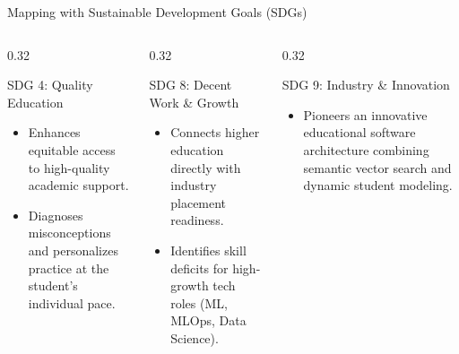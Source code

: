 \documentclass[aspectratio=169,10pt]{beamer}
\begin{document}
\begin{frame}{Mapping with Sustainable Development Goals (SDGs)}
  \begin{columns}[T]
    \begin{column}{0.32\textwidth}
      \begin{block}{SDG 4: Quality Education}
        \small
        \begin{itemize}
          \item Enhances equitable access to high-quality academic support.
          \item Diagnoses misconceptions and personalizes practice at the student's individual pace.
        \end{itemize}
      \end{block}
    \end{column}
    \begin{column}{0.32\textwidth}
      \begin{block}{SDG 8: Decent Work \& Growth}
        \small
        \begin{itemize}
          \item Connects higher education directly with industry placement readiness.
          \item Identifies skill deficits for high-growth tech roles (ML, MLOps, Data Science).
        \end{itemize}
      \end{block}
    \end{column}
    \begin{column}{0.32\textwidth}
      \begin{block}{SDG 9: Industry \& Innovation}
        \small
        \begin{itemize}
          \item Pioneers an innovative educational software architecture combining semantic vector search and dynamic student modeling.
        \end{itemize}
      \end{block}
    \end{column}
  \end{columns}
\end{frame}
\end{document}
